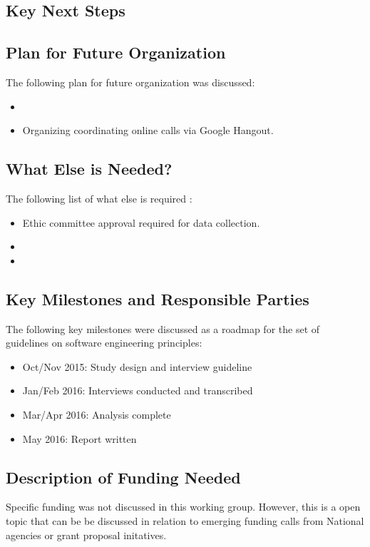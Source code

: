 \subsection{Key Next Steps}

\subsection{Plan for Future Organization}
The following plan for future organization was discussed:
\begin{itemize}
\item 
\item Organizing coordinating online calls via Google Hangout.
\end{itemize}

\subsection{What Else is Needed?}
The following list of what else is required :

\begin{itemize}
\item Ethic committee approval required for data collection.
\item 
\item 
\end{itemize}

\subsection{Key Milestones and Responsible Parties}
The following key milestones were discussed as a roadmap for the set of guidelines on software engineering principles:
\begin{itemize}
\item Oct/Nov 2015: Study design and interview guideline
\item Jan/Feb 2016: Interviews conducted and transcribed
\item Mar/Apr 2016: Analysis complete
\item May 2016: Report written
\end{itemize}

\subsection{Description of Funding Needed}
Specific funding was not discussed in this working group. However, this is a open topic that can be be discussed in relation to emerging funding calls from National agencies or grant proposal initatives.
